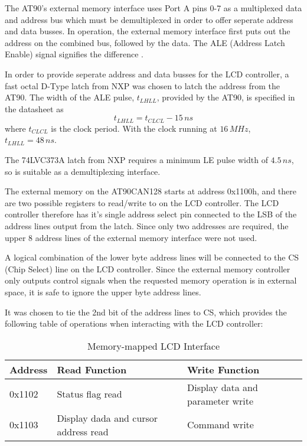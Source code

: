 The AT90's external memory interface uses Port A pins 0-7 as a multiplexed
data and address bus which must be demultiplexed in order to offer
seperate address and data busses. In operation, the external memory
interface first puts out the address on the combined bus, followed
by the data. The ALE (Address Latch Enable) signal signifies the difference
\cite{AT90CAN}.

In order to provide seperate address and data busses for the LCD controller,
a fast octal D-Type latch from NXP was chosen to latch the address
from the AT90. The width of the ALE pulse, $t_{LHLL}$, provided by
the AT90, is specified in the datasheet as \begin{equation}
t_{LHLL}=t_{CLCL}-15\, ns\end{equation}
 where $t_{CLCL}$ is the clock period. With the clock running at
$16\, MHz$, $t_{LHLL}=48\, ns$.

The 74LVC373A latch from NXP requires a minimum LE pulse width of
$4.5\, ns$, so is suitable as a demultiplexing interface.

The external memory on the AT90CAN128 starts at address 0x1100h, and
there are two possible registers to read/write to on the LCD controller.
The LCD controller therefore has it's single address select pin connected
to the LSB of the address lines output from the latch. Since only
two addresses are required, the upper 8 address lines of the external
memory interface were not used.

A logical combination of the lower byte address lines will be connected
to the CS (Chip Select) line on the LCD controller. Since the external
memory controller only outputs control signals when the requested
memory operation is in external space, it is safe to ignore the upper
byte address lines.

It was chosen to tie the 2nd bit of the address lines to CS, which
provides the following table of operations when interacting with the
LCD controller:

%
\begin{table}
\begin{centering}
\caption{Memory-mapped LCD Interface}

\par\end{centering}

\centering{}\begin{tabular}{|l|l|l|}
\hline 
Address  & Read Function  & Write Function\tabularnewline
\hline
\hline 
0x1102  & Status flag read  & Display data and parameter write\tabularnewline
\hline 
0x1103  & Display dada and cursor address read  & Command write\tabularnewline
\hline
\end{tabular}
\end{table}
